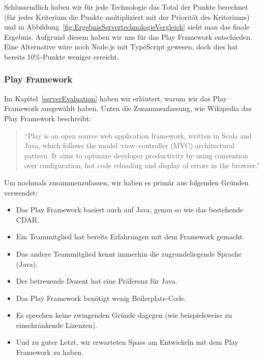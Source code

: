 			Schlussendlich haben wir für jede Technologie das Total der Punkte berechnet (für jedes Kriterium die Punkte multipliziert mit der Priorität des Kriteriums) und in Abbildung~\ref{fig:ErgebnisServertechnologieVergleich} sieht man das finale Ergebnis. Aufgrund diesem haben wir uns für das Play Framework entschieden. Eine Alternative wäre noch Node.js mit TypeScript gewesen, doch dies hat bereits 10\%-Punkte weniger erreicht.

		\subsubsection{Play Framework}
			Im Kapitel~\ref{serverEvaluation} haben wir erläutert, warum wir das Play Framework ausgewählt haben. Unten die Zusammenfassung, wie Wikipedia das Play Framework beschreibt:
			\begin{quote}
				"`Play is an open source web application framework, written in Scala and Java, which follows the model–view–controller (MVC) architectural pattern. It aims to optimize developer productivity by using convention over configuration, hot code reloading and display of errors in the browser."'\cite{playFrameworkWikipedia}
			\end{quote}
			Um nochmals zusammenzufassen, wir haben es primär aus folgenden Gründen verwendet:
			\begin{itemize}
				\item Das Play Framework basiert auch auf Java, genau so wie das bestehende CDAR.
				\item Ein Teammitglied hat bereits Erfahrungen mit dem Framework gemacht.
				\item Das andere Teammitglied kennt immerhin die zugrundeliegende Sprache (Java).
				\item Der betreuende Dozent hat eine Präferenz für Java.
				\item Das Play Framework benötigt wenig Boilerplate-Code.
				\item Es sprechen keine zwingenden Gründe dagegen (wie beispielsweise zu einschränkende Lizenzen).
				\item Und zu guter Letzt, wir erwarteten Spass am Entwickeln mit dem Play Framework zu haben.
			\end{itemize}

